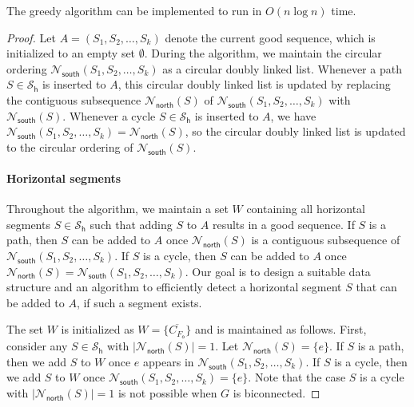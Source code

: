 \documentclass{theoretics}
\newcommand{\FO}{F_\mathsf{o}}
\newcommand{\PH}{\mathcal{S}_\mathsf{h}}
\newcommand{\Nnorth}{\mathcal{N}_\mathsf{north}}
\newcommand{\Nsouth}{\mathcal{N}_\mathsf{south}}
\begin{document}
\begin{lemma}\label{lem-time-sequence}
The greedy algorithm can be implemented to run in $O(n \log n)$ time.
\end{lemma}
\begin{proof}
 Let $A=(S_1, S_2, \ldots, S_k)$ denote the current good sequence, which is initialized to an empty set $\emptyset$.
 During the algorithm, we  maintain the circular ordering  $\Nsouth(S_1, S_2, \ldots, S_{k})$ as a circular doubly linked list. Whenever a path $S \in \PH$ is inserted to $A$, this circular doubly linked list is updated by replacing the contiguous subsequence $\Nnorth(S)$ of  $\Nsouth(S_1, S_2, \ldots, S_{k})$ with $\Nsouth(S)$. Whenever a cycle $S \in \PH$ is inserted to $A$, we have $\Nsouth(S_1, S_2, \ldots, S_{k}) = \Nnorth(S)$, so the circular doubly linked list is updated to the circular ordering 
 of $\Nsouth(S)$.
 
 \paragraph{Horizontal segments}
 Throughout the algorithm, we maintain a set $W$ containing all horizontal segments $S \in \PH$ such that adding $S$ to $A$ results in a good sequence. If $S$ is a path, then $S$ can  be added to $A$ once $\Nnorth(S)$ is a  contiguous subsequence of $\Nsouth(S_1, S_2, \ldots, S_{k})$. If $S$ is a cycle, then $S$ can  be added to $A$ once $\Nnorth(S) = \Nsouth(S_1, S_2, \ldots, S_{k})$. Our goal is to design a suitable data structure and an algorithm to efficiently detect a horizontal segment $S$ that can be added to $A$, if such a segment exists.

 The set $W$ is initialized as $W=\{\overline{C_{\FO}}\}$ and is maintained as follows. 
 First, consider any $S \in \PH$ with $|\Nnorth(S)| = 1$.  Let $\Nnorth(S) = \{e\}$.  If $S$ is a path, then we add $S$ to $W$ once $e$ appears in $\Nsouth(S_1, S_2, \ldots, S_{k})$. If $S$ is a cycle, then we add $S$ to $W$ once $\Nsouth(S_1, S_2, \ldots, S_{k})=\{e\}$. Note that the case $S$ is a cycle with $|\Nnorth(S)| = 1$ is not possible when $G$ is biconnected.
 

\end{proof}
\end{document}
